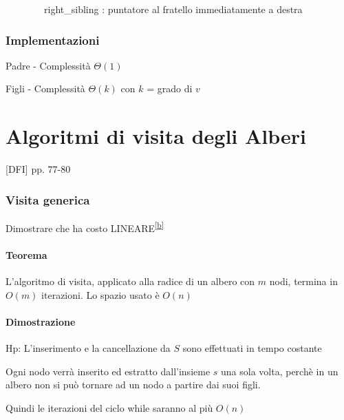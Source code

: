 \documentclass[tikz]{article}
\let\oldparagraph\paragraph
\renewcommand{\paragraph}[1]{\oldparagraph{#1}\mbox{}}
\begin{document}
{{{{~~~~~~~~right\_sibling : puntatore al fratello immediatamente a destra}

\subsubsection{Implementazioni}

{Padre - Complessità $\Theta(1)$}



{Figli - Complessità $\Theta(k)$ con $k$ = grado di $v$}



\section{Algoritmi di visita degli Alberi}

{{[}DFI{]} pp. 77-80}

\subsubsection{Visita generica}



{Dimostrare che ha costo LINEARE}\textsuperscript{\protect\hyperlink{cmnt2}{{[}b{]}}}

\hypertarget{h.6xasx7f8zgn1}{\paragraph{\texorpdfstring{{Teorema}}{Teorema}}\label{h.6xasx7f8zgn1}}

{L'algoritmo di visita, applicato alla radice di un albero con $m$ nodi, termina in $O(m)$ iterazioni. Lo spazio usato è $O(n)$}

\hypertarget{h.zdc8liauzt1c}{\paragraph{\texorpdfstring{{Dimostrazione}}{Dimostrazione}}\label{h.zdc8liauzt1c}}

{Hp: L'inserimento e la cancellazione da $S$ sono effettuati in tempo costante}

{Ogni nodo verrà inserito ed estratto dall'insieme $s$ una sola volta, perchè in un albero non si può tornare ad un nodo a partire dai suoi figli.}

{Quindi le iterazioni del ciclo while saranno al più $O(n)$}

}}}
\end{document}
